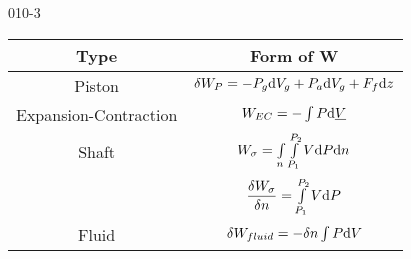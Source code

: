 \begin{mitframe}{010-3}


	\begin{tabular}{|c|c|}
	\hline
	Type & Form of W\\ \hline
    Piston & $\blthick\work_{\p}=-\p_{\grav}\mathrm{d}\vol_{\grav}+\p_{\activity}\mathrm{d}\vol_{\grav}+\force_{\fug}\mathrm{d}\heightz$ \\ \hline
    Expansion-Contraction & $\work_{EC}=-\int\p\mathrm{d}\uline{\vol}$ \\ \hline
   	Shaft & $\work_{\molecrad}=\int\limits_{n}\int\limits_{\p_{1}}^{\p_{2}}\vol\mathrm{d}\p\mathrm{d}n$ \\ 
& $\dfrac{\blthick\work_{\molecrad}}{\blthick n}=\int\limits_{\p_{1}}^{\p_{2}}\vol\mathrm{d}\p$ \\    \hline 
    Fluid & $\blthick\work_{fluid}=-\blthick n\int\p\mathrm{d}\vol$ \\ \hline
   
    \end{tabular}

\end{mitframe}